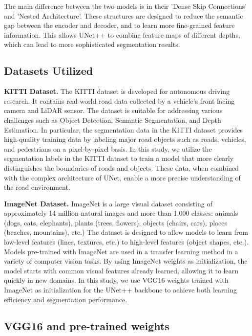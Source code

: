 \documentclass[10pt,twocolumn,letterpaper,final]{article} %
\begin{document}
The main difference between the two models is in their 'Dense Skip Connections' and 'Nested Architecture'. These structures are designed to reduce the semantic gap between the encoder and decoder, and to learn more fine-grained feature information. This allows UNet++ to combine feature maps of different depths, which can lead to more sophisticated segmentation results.

\subsection{Datasets Utilized}

\textbf{KITTI Dataset.} The KITTI dataset is developed for autonomous driving research. It contains real-world road data collected by a vehicle's front-facing camera and LiDAR sensor. The dataset is suitable for addressing various challenges such as Object Detection, Semantic Segmentation, and Depth Estimation. In particular, the segmentation data in the KITTI dataset provides high-quality training data by labeling major road objects such as roads, vehicles, and pedestrians on a pixel-by-pixel basis. In this study, we utilize the segmentation labels in the KITTI dataset to train a model that more clearly distinguishes the boundaries of roads and objects. These data, when combined with the complex architecture of UNet, enable a more precise understanding of the road environment.

\textbf{ImageNet Dataset.} ImageNet is a large visual dataset consisting of approximately 14 million natural images and more than 1,000 classes: animals (dogs, cats, elephants), plants (trees, flowers), objects (chairs, cars), places (beaches, mountains), etc.) The dataset is designed to allow models to learn from low-level features (lines, textures, etc.) to high-level features (object shapes, etc.). Models pre-trained with ImageNet are used in a transfer learning method in a variety of computer vision tasks. By using ImageNet weights as initialization, the model starts with common visual features already learned, allowing it to learn quickly in new domains. In this study, we use VGG16 weights trained with ImageNet as initialization for the UNet++ backbone to achieve both learning efficiency and segmentation performance.

\subsection{VGG16 and pre-trained weights}
\end{document}
